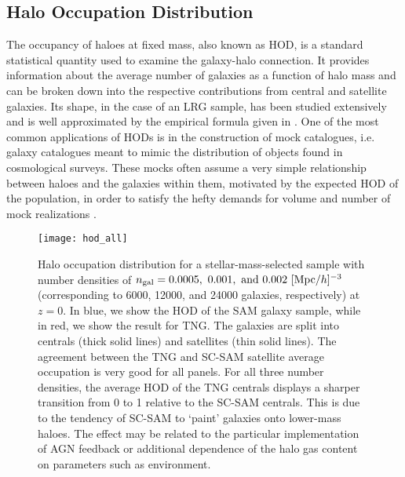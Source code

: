\documentclass[fleqn,usenatbib]{mnras}
\begin{document}
\subsection{Halo Occupation Distribution}
\label{sec:hod}
The occupancy of haloes at fixed mass, also known as HOD, is a standard statistical quantity used to examine the galaxy-halo connection. It provides information about the average number of galaxies as a function of halo mass and can be broken down into the respective contributions from central and satellite galaxies. Its shape, in the case of an LRG sample, has been studied extensively and is well approximated by the empirical formula given in \citet{Zheng:2004id}. One of the most common applications of HODs is in the construction of mock catalogues, i.e. galaxy catalogues meant to mimic the distribution of objects found in cosmological surveys. These mocks often assume a very simple relationship between haloes and the galaxies within them, motivated by the expected HOD of the population, in order to satisfy the hefty demands for volume and number of mock realizations \citep{2008RSPTA.366.4381B}.

\begin{figure*}
\centering  
\texttt{[image: hod\_all]}
\caption{Halo occupation distribution for a stellar-mass-selected sample with number densities of $n_{\rm gal} = 0.0005, \ 0.001, \ {\rm and} \ 0.002 \ [{\rm Mpc}/h]^{-3}$ (corresponding to 6000, 12000, and 24000 galaxies, respectively) at $z = 0$. In blue, we show the HOD of the SAM galaxy sample, while in red, we show the result for TNG. The galaxies are split into centrals (thick solid lines) and satellites (thin solid lines). The agreement between the TNG and SC-SAM satellite average occupation is very good for all panels. For all three number densities, the average HOD of the TNG centrals displays a sharper transition from 0 to 1 relative to the SC-SAM centrals. This is due to the tendency of SC-SAM to `paint' galaxies onto lower-mass haloes. The effect may be related to the particular implementation of AGN feedback or additional dependence of the halo gas content on parameters such as environment.}
\label{fig:hod_all}
\end{figure*}
\end{document}
